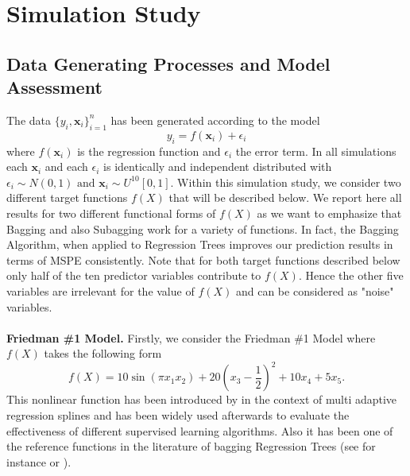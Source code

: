 \section{Simulation Study} \label{sec:Simulation}

\subsection{Data Generating Processes and Model Assessment} \label{sub:DGP}
The data  $\{y_{i},\mathbf{x}_{i} \}_{i=1}^{n}$ has been generated according to the model
$$
y_{i} = f(\mathbf{x}_{i}) + \epsilon_{i}
$$
where $f(\mathbf{x}_{i})$ is the regression function and $\epsilon_{i}$ the error term.
In all simulations each $\mathbf{x}_{i}$ and each $\epsilon_{i}$ is identically and independent distributed with $\epsilon_{i} \sim N(0,1) \text{ and } \mathbf{x}_{i} \sim U^{10}[0,1]$.
Within this simulation study, we consider two different target functions $f(X)$
that will be described below. We report here all results for two different functional forms of $f(X)$ as we want to emphasize that Bagging and also Subagging work for a variety of functions. In fact, the Bagging Algorithm, when applied to Regression Trees improves our prediction results in terms of MSPE consistently. Note that for both target functions described below only half of the ten predictor variables contribute to $f(X)$. Hence the other five variables are irrelevant for the value of $f(X)$ and can be considered as "noise" variables.\\
\\
\textbf{Friedman \#1 Model.}
Firstly, we consider the Friedman \#1 Model where $f(X)$ takes the following form
$$
f(X) = 10 \sin(\pi x_{1} x_{2}) + 20(x_{3} - \frac{1}{2})^{2} + 10 x_{4} + 5 x_{5}.
$$
This nonlinear function has been introduced by \cite{friedman1991} in the context of multi adaptive regression splines and has been widely used afterwards to evaluate the effectiveness of different supervised learning algorithms. Also it has been one of the reference functions in the literature of bagging Regression Trees (see for instance \cite{Breiman1996} or \cite{Buhlmann2002}).\\
